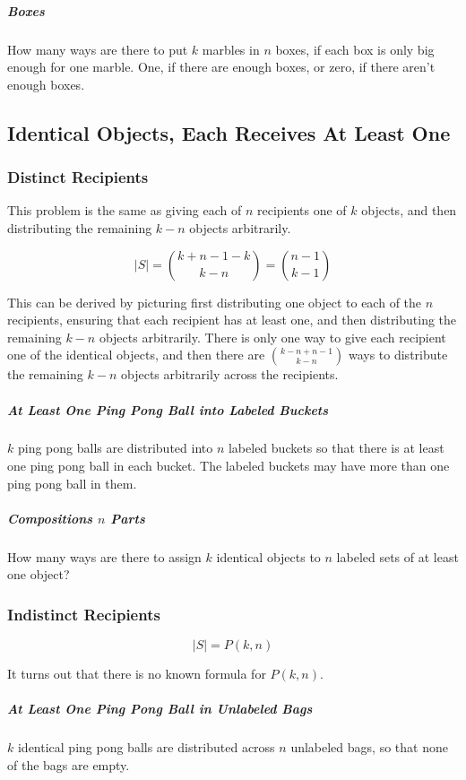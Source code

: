 \subparagraph{Boxes} How many ways are there to put $k$ marbles in $n$ boxes, if each box is only big enough for one marble. One, if there are enough boxes, or zero, if there aren't enough boxes.


\subsection{Identical Objects, Each Receives At Least One}

\subsubsection{Distinct Recipients}
This problem is the same as giving each of $n$ recipients one of $k$ objects, and then distributing the remaining $k-n$ objects arbitrarily.  

\begin{equation}
|S| = {k+n-1-k \choose k-n}= {n-1 \choose k-1}
\end{equation}

This can be derived by picturing first distributing one object to each of the $n$ recipients, ensuring that each recipient has at least one, and then distributing the remaining $k-n$ objects arbitrarily. There is only one way to give each recipient one of the identical objects, and then there are ${k-n+n-1\choose k-n}$ ways to distribute the remaining $k-n$ objects arbitrarily across the recipients.

\subparagraph{At Least One Ping Pong Ball into Labeled Buckets} $k$ ping pong balls are distributed into $n$ labeled buckets so that there is at least one ping pong ball in each bucket. The labeled buckets may have more than one ping pong ball in them.

\subparagraph{Compositions $n$ Parts} How many ways are there to assign $k$ identical objects to $n$ labeled sets of at least one object?

\subsubsection{Indistinct Recipients}

\begin{equation}
|S| = P(k,n)
\end{equation}

It turns out that there is no known formula for $P(k,n)$.

\subparagraph{At Least One Ping Pong Ball in Unlabeled Bags} $k$ identical ping pong balls are distributed across $n$ unlabeled bags, so that none of the bags are empty. 

